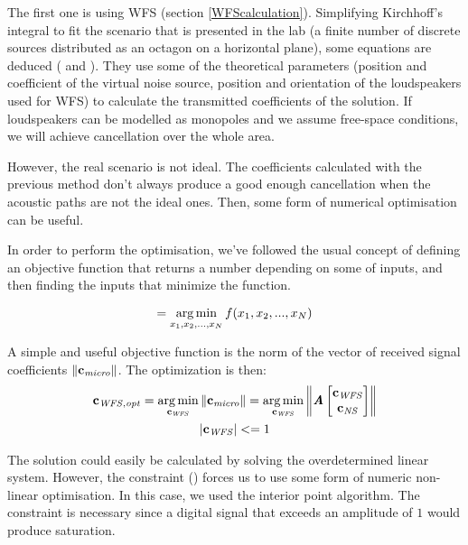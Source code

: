 The first one is using WFS (section \ref{WFScalculation}). Simplifying Kirchhoff's integral to fit the scenario that is presented in the lab (a finite number of discrete sources distributed as an octagon on a horizontal plane), some equations are deduced ( and ). They use some of the theoretical parameters (position and coefficient of the virtual noise source, position and orientation of the loudspeakers used for WFS) to calculate the transmitted coefficients of the solution. If loudspeakers can be modelled as monopoles and we assume free-space conditions, we will achieve cancellation over the whole area.

However, the real scenario is not ideal. The coefficients calculated with the previous method don't always produce a good enough cancellation when the acoustic paths are not the ideal ones. Then, some form of numerical optimisation can be useful.

In order to perform the optimisation, we've followed the usual concept of defining an objective function that returns a number depending on some of inputs, and then finding the inputs that minimize the function.

\begin{equation}
[x_{\mathit{opt} (1)}, x_{\mathit{opt} (2)}, ..., x_{\mathit{opt} (N)}] = \argmin_{x_1, x_2, ..., x_N} f(x_1, x_2, ..., x_N)
\label{optimisationGeneral}
\end{equation}

A simple and useful objective function is the norm of the vector of received signal coefficients $\left\| \mathbf{c_\mathit{micro}} \right\|$. The optimization is then:
\begin{gather}
\mathbf{c_{\mathit{WFS}, \mathit{opt}}} =
\operatorname*{arg\,min}_{\mathbf{c_\mathit{WFS}}}
\left\| \mathbf{c_\mathit{micro}} \right\| =
\operatorname*{arg\,min}_{\mathbf{c_\mathit{WFS}}}
\left\| \bm{\mathit{A}}
\begin{bmatrix}
\mathbf{c_\mathit{WFS}}\\
\mathbf{c_\mathit{NS}}\\
\end{bmatrix}
 \right\| \\
\left | \mathbf{c_{\mathit{WFS}}} \right | <= 1
\label{OptConstraint}
\end{gather}


The solution could easily be calculated by solving the overdetermined linear system. However, the constraint () forces us to use some form of numeric non-linear optimisation. In this case, we used the interior point algorithm. The constraint is necessary since a digital signal that exceeds an amplitude of $1$ would produce saturation.

